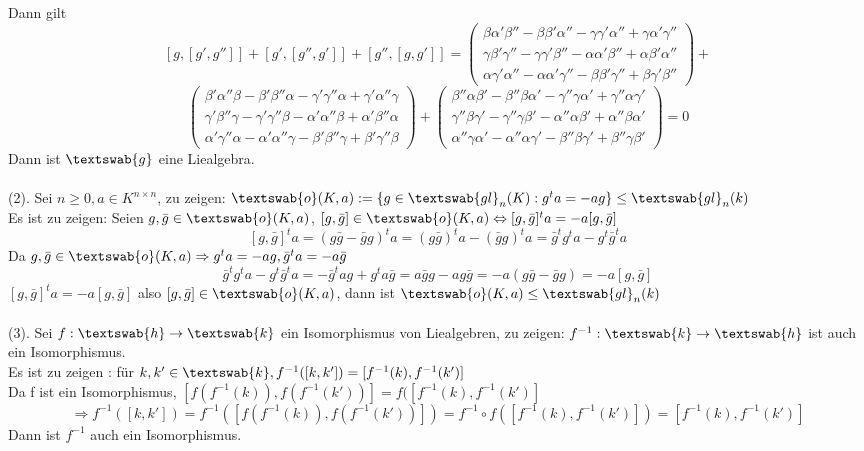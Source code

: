\documentclass[12pt,leqno,twoside]{book}
\newcommand{\g}{\textswab{g}}
\begin{document}
Dann gilt 
\[[g,[g',g'']]+[g',[g'',g']]+[g'',[g,g']]=\left(\begin{array}{c} \beta\alpha'\beta''-\beta\beta'\alpha''-\gamma\gamma'\alpha''+\gamma\alpha'\gamma'' \\ \gamma\beta'\gamma''-\gamma\gamma'\beta''-\alpha\alpha'\beta''+\alpha\beta'\alpha'' \\ \alpha\gamma'\alpha''-\alpha\alpha'\gamma''-\beta\beta'\gamma''+\beta\gamma'\beta'' \end{array}\right)+\]\[\left(\begin{array}{c} \beta'\alpha''\beta-\beta'\beta''\alpha-\gamma'\gamma''\alpha+\gamma'\alpha''\gamma \\ \gamma'\beta''\gamma-\gamma'\gamma''\beta-\alpha'\alpha''\beta+\alpha'\beta''\alpha \\ \alpha'\gamma''\alpha-\alpha'\alpha''\gamma-\beta'\beta''\gamma+\beta'\gamma''\beta \end{array}\right)+\left(\begin{array}{c} \beta''\alpha\beta'-\beta''\beta\alpha'-\gamma''\gamma\alpha'+\gamma''\alpha\gamma' \\ \gamma''\beta\gamma'-\gamma''\gamma\beta'-\alpha''\alpha\beta'+\alpha''\beta\alpha' \\ \alpha''\gamma\alpha'-\alpha''\alpha\gamma'-\beta''\beta\gamma'+\beta''\gamma\beta' \end{array}\right)=0\]
Dann ist $\g$ eine Liealgebra.\\
\\
(2). Sei $n\geq0, a\in K^{n\times n}$, zu zeigen: $\textswab{o}(K,a):=\{g\in\textswab{gl}_n(K):g^ta=-ag\}\leq\textswab{gl}_n(k)$\\
Es ist zu zeigen: Seien $g,\bar{g}\in\textswab{o}(K,a)$, $[g,\bar{g}]\in\textswab{o}(K,a)\Leftrightarrow[g,\bar{g}]^ta=-a[g,\bar{g}]$\\
\[[g,\bar{g}]^ta=(g\bar{g}-\bar{g}g)^ta=(g\bar{g})^ta-(\bar{g}g)^ta=\bar{g}^tg^ta-g^t\bar{g}^ta\]
Da $g,\bar{g}\in\textswab{o}(K,a)\Rightarrow g^ta=-ag,\bar{g}^ta=-a\bar{g}$\\
\[\bar{g}^tg^ta-g^t\bar{g}^ta=-\bar{g}^tag+g^ta\bar{g}=a\bar{g}g-ag\bar{g}=-a(g\bar{g}-\bar{g}g)=-a[g,\bar{g}]\]
$[g,\bar{g}]^ta=-a[g,\bar{g}]$ also $[g,\bar{g}]\in\textswab{o}(K,a)$, dann ist $\textswab{o}(K,a)\leq\textswab{gl}_n(k)$\\
\\
(3). Sei $f:\textswab{h}\rightarrow\textswab{k}$ ein Isomorphismus von Liealgebren, zu zeigen: $f^{-1}:\textswab{k}\rightarrow\textswab{h}$ ist auch ein Isomorphismus.\\
Es ist zu zeigen : f\"{u}r $k,k'\in\textswab{k}, f^{-1}([k,k'])=[f^{-1}(k),f^{-1}(k')]$\\
Da f ist ein Isomorphismus, $[f(f^{-1}(k)),f(f^{-1}(k'))]=f([f^{-1}(k),f^{-1}(k')]$
\[\Rightarrow f^{-1}([k,k'])=f^{-1}([f(f^{-1}(k)),f(f^{-1}(k'))])=f^{-1}\circ f([f^{-1}(k),f^{-1}(k')])=[f^{-1}(k),f^{-1}(k')]\]
Dann ist $f^{-1}$ auch ein Isomorphismus.
\end{document}
